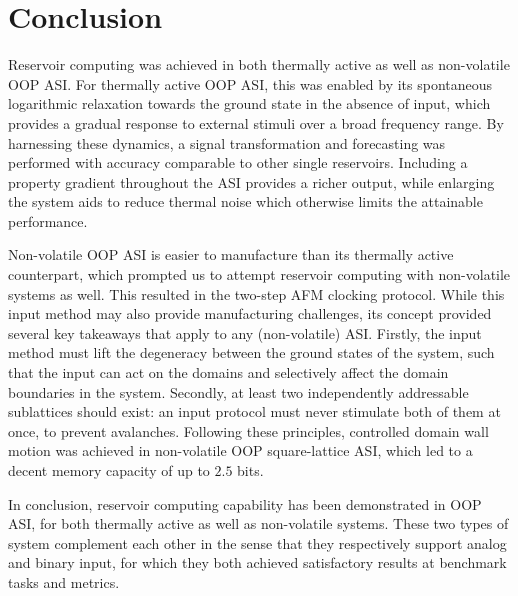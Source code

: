 \section{Conclusion}
Reservoir computing was achieved in both thermally active as well as non-volatile OOP ASI.
For thermally active OOP ASI, this was enabled by its spontaneous logarithmic relaxation towards the ground state in the absence of input, which provides a gradual response to external stimuli over a broad frequency range.
By harnessing these dynamics, a signal transformation and forecasting was performed with accuracy comparable to other single reservoirs.
Including a property gradient throughout the ASI provides a richer output, while enlarging the system aids to reduce thermal noise which otherwise limits the attainable performance. \par
Non-volatile OOP ASI is easier to manufacture than its thermally active counterpart, which prompted us to attempt reservoir computing with non-volatile systems as well.
This resulted in the two-step AFM clocking protocol.
While this input method may also provide manufacturing challenges, its concept provided several key takeaways that apply to any (non-volatile) ASI.
Firstly, the input method must lift the degeneracy between the ground states of the system, such that the input can act on the domains and selectively affect the domain boundaries in the system.
Secondly, at least two independently addressable sublattices should exist: an input protocol must never stimulate both of them at once, to prevent avalanches.
Following these principles, controlled domain wall motion was achieved in non-volatile OOP square-lattice ASI, which led to a decent memory capacity of up to $2.5$ bits. \par
In conclusion, reservoir computing capability has been demonstrated in OOP ASI, for both thermally active as well as non-volatile systems.
These two types of system complement each other in the sense that they respectively support analog and binary input, for which they both achieved satisfactory results at benchmark tasks and metrics.
